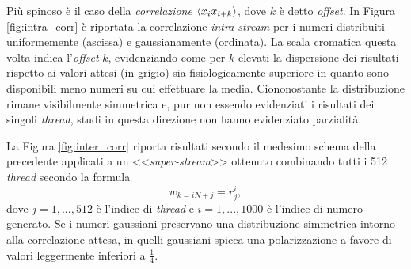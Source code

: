 Più spinoso è il caso della \textit{correlazione} $\braket{x_i x_{i+k}}$, dove $k$ è detto \textit{offset}. In Figura \ref{fig:intra_corr} è riportata la correlazione \textit{intra-stream} per i numeri distribuiti uniformemente (ascissa) e gaussianamente (ordinata). La scala cromatica questa volta indica l'\textit{offset} $k$, evidenziando come per $k$ elevati la dispersione dei risultati rispetto ai valori attesi (in grigio) sia fisiologicamente superiore in quanto sono disponibili meno numeri su cui effettuare la media. Ciononostante la distribuzione rimane visibilmente simmetrica e, pur non essendo evidenziati i risultati dei singoli \textit{thread}, studi in questa direzione non hanno evidenziato parzialità.

La Figura \ref{fig:inter_corr} riporta risultati secondo il medesimo schema della precedente applicati a un <<\textit{super-stream}>> ottenuto combinando tutti i 512 \textit{thread} secondo la formula
\begin{equation}
    w_{k=iN+j} = r_j^i,
    \label{eq:superstream}
\end{equation}
dove $j=1,...,512$ è l'indice di \textit{thread} e $i=1,...,1000$ è l'indice di numero generato. Se i numeri gaussiani preservano una distribuzione simmetrica intorno alla correlazione attesa, in quelli gaussiani spicca una polarizzazione a favore di valori leggermente inferiori a $\frac{1}{4}$.


